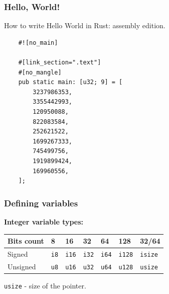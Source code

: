 \documentclass[aspectratio=1610,t]{beamer}
\begin{document}


\begin{frame}[fragile]
\frametitle{Hello, World!}

How to write Hello World in Rust: assembly edition.

\begin{verbatim}
    #![no_main]

    #[link_section=".text"]
    #[no_mangle]
    pub static main: [u32; 9] = [
        3237986353,
        3355442993,
        120950088,
        822083584,
        252621522,
        1699267333,
        745499756,
        1919899424,
        169960556,
    ];
\end{verbatim}
\end{frame}


\begin{frame}[fragile]
\frametitle{Defining variables}
\textbf{Integer variable types:}

\begin{table}[]
\begin{tabular}{|l|l|l|l|l|l|l|}
\hline
Bits count & 8  & 16  & 32  & 64  & 128  & 32/64 \\ \hline
Signed     & \texttt{i8} & \texttt{i16} & \texttt{i32} & \texttt{i64} & \texttt{i128} & \texttt{isize} \\ \hline
Unsigned   & \texttt{u8} & \texttt{u16} & \texttt{u32} & \texttt{u64} & \texttt{u128} & \texttt{usize} \\ \hline
\end{tabular}
\end{table}

\texttt{usize} - size of the pointer.
\end{frame}

\end{document}
